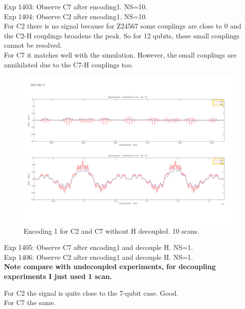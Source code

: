 \clearpage
Exp 1403: Observe C7 after encoding1. NS=10.\\
Exp 1404: Observe C2 after encoding1. NS=10.\\

For C2 there is no signal because for Z24567 some couplings are close to 0 and the C2-H couplings broadens the peak. So for 12 qubits, these small couplings cannot be resolved.\\
For C7 it matches well with the simulation. However, the small couplings are annihilated due to the C7-H couplings too.

\begin{figure}[htb]
\begin{center}
\includegraphics[width=\columnwidth]{Encoding1_without_decouple.pdf}
\end{center}
\setlength{\abovecaptionskip}{-0.35cm}
\caption{\footnotesize{Encoding 1 for C2 and C7 without H decoupled. 10 scans.}}\label{1403and1404}
\end{figure}

\clearpage
Exp 1405: Observe C7 after encoding1 and decouple H. NS=1.\\
Exp 1406: Observe C2 after encoding1 and decouple H. NS=1.\\
\textbf{Note compare with undecoupled experiments, for decoupling experiments I just used 1 scan.}

For C2 the signal is quite close to the 7-qubit case. Good.\\
For C7 the same.


